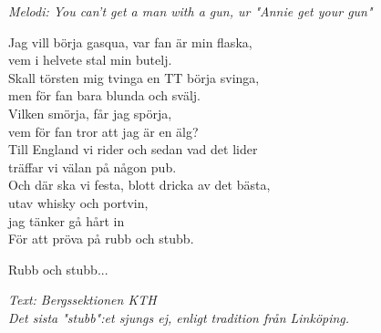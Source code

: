 {\footnotesize\textit{Melodi: You can't get a man with a gun, ur "Annie get your gun"}}\par
\vspace{10pt}
Jag vill börja gasqua, var fan är min flaska,\\
vem i helvete stal min butelj.\\
Skall törsten mig tvinga en TT börja svinga,\\
men för fan bara blunda och svälj.\\
Vilken smörja, får jag spörja,\\
vem för fan tror att jag är en älg?\\
Till England vi rider och sedan vad det lider\\
träffar vi välan på någon pub.\\
Och där ska vi festa, blott dricka av det bästa,\\
utav whisky och portvin, \\
jag tänker gå hårt in\\
För att pröva på rubb och stubb.\par
\vspace{10pt}
Rubb och stubb...\par
\vspace{10pt}
{\footnotesize\textit{Text: Bergssektionen KTH\\
Det sista "stubb":et sjungs ej, enligt tradition från Linköping.}}
